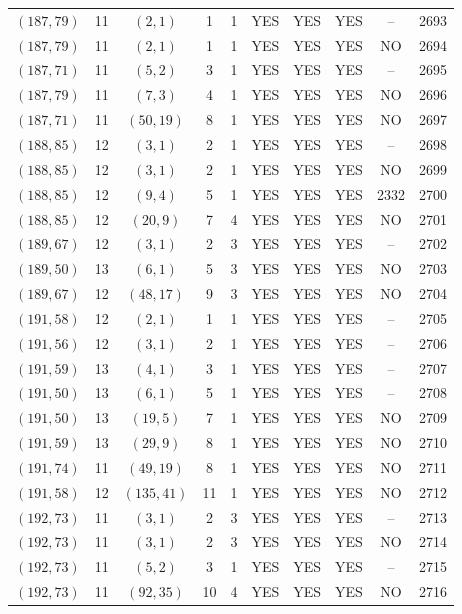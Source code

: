 \begin{longtable}{|c|c|c|c|c|c|c|c|c|c|}
$(187, 79)$ & 11 & $(2, 1)$ & 1 & 1 & YES & YES & YES & -- & 2693\\
$(187, 79)$ & 11 & $(2, 1)$ & 1 & 1 & YES & YES & YES & NO & 2694\\
$(187, 71)$ & 11 & $(5, 2)$ & 3 & 1 & YES & YES & YES & -- & 2695\\
$(187, 79)$ & 11 & $(7, 3)$ & 4 & 1 & YES & YES & YES & NO & 2696\\
$(187, 71)$ & 11 & $(50, 19)$ & 8 & 1 & YES & YES & YES & NO & 2697\\
$(188, 85)$ & 12 & $(3, 1)$ & 2 & 1 & YES & YES & YES & -- & 2698\\
$(188, 85)$ & 12 & $(3, 1)$ & 2 & 1 & YES & YES & YES & NO & 2699\\
$(188, 85)$ & 12 & $(9, 4)$ & 5 & 1 & YES & YES & YES & 2332 & 2700\\
$(188, 85)$ & 12 & $(20, 9)$ & 7 & 4 & YES & YES & YES & NO & 2701\\
$(189, 67)$ & 12 & $(3, 1)$ & 2 & 3 & YES & YES & YES & -- & 2702\\
$(189, 50)$ & 13 & $(6, 1)$ & 5 & 3 & YES & YES & YES & NO & 2703\\
$(189, 67)$ & 12 & $(48, 17)$ & 9 & 3 & YES & YES & YES & NO & 2704\\
$(191, 58)$ & 12 & $(2, 1)$ & 1 & 1 & YES & YES & YES & -- & 2705\\
$(191, 56)$ & 12 & $(3, 1)$ & 2 & 1 & YES & YES & YES & -- & 2706\\
$(191, 59)$ & 13 & $(4, 1)$ & 3 & 1 & YES & YES & YES & -- & 2707\\
$(191, 50)$ & 13 & $(6, 1)$ & 5 & 1 & YES & YES & YES & -- & 2708\\
$(191, 50)$ & 13 & $(19, 5)$ & 7 & 1 & YES & YES & YES & NO & 2709\\
$(191, 59)$ & 13 & $(29, 9)$ & 8 & 1 & YES & YES & YES & NO & 2710\\
$(191, 74)$ & 11 & $(49, 19)$ & 8 & 1 & YES & YES & YES & NO & 2711\\
$(191, 58)$ & 12 & $(135, 41)$ & 11 & 1 & YES & YES & YES & NO & 2712\\
$(192, 73)$ & 11 & $(3, 1)$ & 2 & 3 & YES & YES & YES & -- & 2713\\
$(192, 73)$ & 11 & $(3, 1)$ & 2 & 3 & YES & YES & YES & NO & 2714\\
$(192, 73)$ & 11 & $(5, 2)$ & 3 & 1 & YES & YES & YES & -- & 2715\\
$(192, 73)$ & 11 & $(92, 35)$ & 10 & 4 & YES & YES & YES & NO & 2716\\

\end{longtable}
